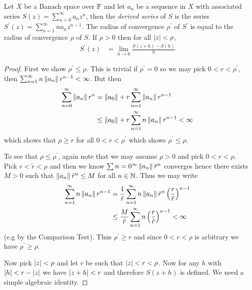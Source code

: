 \begin{prop}\label{banach:DifferentiationOfPowerSeries}Let $X$ be a
  Banach space over $\mathbb{F}$ and let $a_n$ be a sequence in $X$ with
  associated series $S(z) = \sum_{n=0}^\infty a_n z^n$, then the
  \emph{derived series} of $S$ is the series $S^\prime(z) =
  \sum_{n=1}^\infty n a_n z^{n-1}$.   The radius of convergence
  $\rho^\prime$ of
  $S^\prime$ is equal to the radius of convergence $\rho$ of $S$.   If
  $\rho > 0$ then for all $\left \vert z \right \vert < \rho$,
  \begin{align*}
    S^ \prime(z) &= \lim_{h \to 0} \frac{S(z+h) - S(h)}{h}
  \end{align*}
\end{prop}
\begin{proof}
  First we show $\rho^\prime \leq \rho$.   This is trivial if
  $\rho^\prime = 0$ so we may pick $0 < r < \rho^\prime$, then
  $\sum_{n=1}^\infty n \left \lVert a_n \right \rVert r^{n-1} < \infty$.   But then
  \begin{align*}
    \sum_{n=0}^\infty \left \lVert a_n \right \rVert r^n
    &= \left \lVert a_0 \right \rVert + r\sum_{n=1}^\infty \left \lVert a_n \right \rVert r^{n-1} \\
    &\leq \left \lVert a_0 \right \rVert + r\sum_{n=1}^\infty n\left \lVert a_n \right \rVert r^{n-1} < \infty
  \end{align*}
  which shows that $\rho \geq r$ for all $0 < r < \rho^\prime$ which
  shows $\rho^\prime \leq \rho$.

  To see that $\rho\leq \rho^\prime$, again note that we may assume
  $\rho > 0$ and pick $0 < r < \rho$.   Pick $r < \tilde{r} < \rho$
  and then we know $\sum{n=0}^\infty \left \lVert a_n \right \rVert \tilde{r}^n$ converges
  hence there exists $M > 0$ such that $\left \lVert a_n \right \rVert \tilde{r}^n \leq M$
  for all $n \in \mathbb{N}$.   Thus we may write
  \begin{align*}
    \sum_{n=1}^\infty n \left \lVert a_n \right \rVert r^{n-1}
    &= \frac{1}{\tilde{r}}
                                             \sum_{n=1}^\infty n
                                             \left \lVert a_n \right \rVert \tilde{r}^n
                                             \left(\frac{r}{\tilde{r}}\right)^{n-1} \\
    &\leq \frac{M}{\tilde{r}}
                                             \sum_{n=1}^\infty n
      \left(\frac{r}{\tilde{r}}\right)^{n-1} < \infty
  \end{align*}
  (e.g by the Comparison Test).   Thus $\rho^\prime \geq r$ and since
  $0 < r < \rho$ is arbitrary we have $\rho^\prime \geq \rho$.

Now pick $\left \vert z \right \vert < \rho$ and let $r$ be such that $\left \vert z \right \vert < r <
\rho$.  Now for any $h$ with $\left \vert h \right \vert < r - \left \vert z \right \vert$ we have
$\left \vert z+h \right \vert < r$ and therefore $S(z+h)$ is defined.   We need a simple
algebraic identity.


\end{proof}
